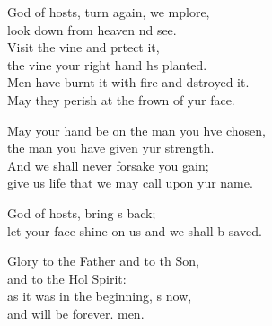 \begin{psalmverse}
\begin{patverse}
God of hosts, turn again, we \pointup{\i}mplore,\Med\\
look down from heaven nd see.\\
Visit the vine and prtect it,\Med\\
the vine your right hand hs planted.\\
Men have burnt it with fire and dstroyed it.\Med\\
May they perish at the frown of yur face.

May your hand be on the man you hve chosen,\Med\\
the man you have given yur strength.\\
And we shall never forsake you gain;\Med\\
give us life that we may call upon yur name.

God of hosts, bring s back;\Med\\
let your face shine on us and we shall b saved.

Glory to the Father and to th Son,\Med\\
and to the Hol Spirit:\\
as it was in the beginning, \pointup{\i}s now,\Med\\
and will be forever. men.
  \end{patverse}
\end{psalmverse}
